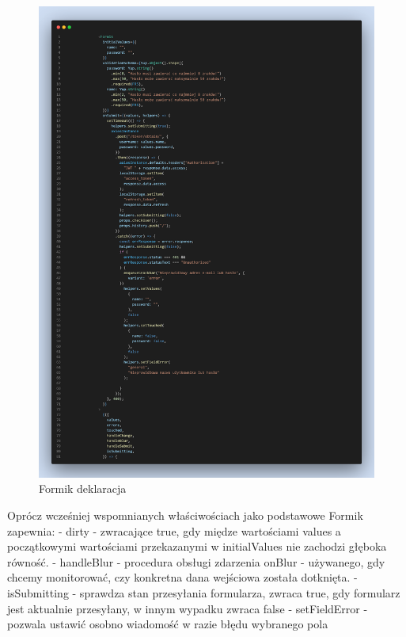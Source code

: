 \documentclass[oneside,polski,logo,indent]{amuthesis}
\begin{document}
\begin{enumerate}
\begin{enumerate}
\begin{figure}[H]
\centering
\includegraphics[width=13cm]{Formik deklaracja.png}
\caption{Formik deklaracja
}

\end{figure}

Oprócz wcześniej wspomnianych właściwościach jako podstawowe Formik zapewnia:
\newline
- dirty - zwracające true, gdy międze wartościami values a początkowymi wartościami przekazanymi w initialValues nie zachodzi głęboka równość.
\newline
- handleBlur - procedura obsługi zdarzenia onBlur - używanego, gdy chcemy monitorować, czy konkretna dana wejściowa została dotknięta.
\newline
- isSubmitting - sprawdza stan przesyłania formularza, zwraca true, gdy formularz jest aktualnie przesyłany, w innym wypadku zwraca false
\newline
- setFieldError - pozwala ustawić osobno wiadomość w razie błędu wybranego pola
\newline






\end{enumerate}
\end{enumerate}
\end{document}
